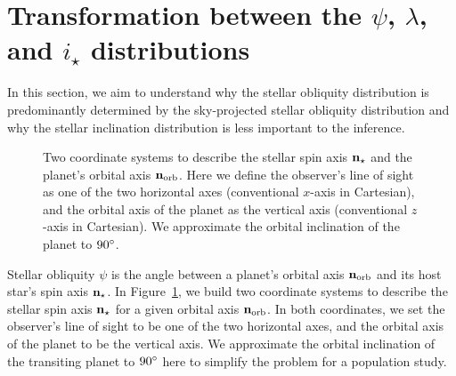 \documentclass[twocolumn,times]{aastex631}
\begin{document}
\section{Transformation between the $\psi$, $\lambda$, and \lowercase{$i_\star$} distributions}\label{sec:jacobian}

In this section, we aim to understand why the stellar obliquity distribution is predominantly determined by the sky-projected stellar obliquity distribution and why the stellar inclination distribution is less important to the inference.

\begin{figure*}[ht!]
    \vspace*{-1.5cm}
    \caption{Two coordinate systems to describe the stellar spin axis $\bf{n}_{\star}$ and the planet's orbital axis $\bf{n}_{\rm orb}$. Here we define the observer's line of sight as one of the two horizontal axes (conventional $x$-axis in Cartesian), and the orbital axis of the planet as the vertical axis (conventional $z$-axis in Cartesian). We approximate the orbital inclination of the planet to $90\mbox{$^\circ$}$.}
    \label{fig:coord}
\end{figure*}

Stellar obliquity $\psi$ is the angle between a planet's orbital axis $\bf{n}_{\rm orb}$ and its host star's spin axis $\bf{n}_{\star}$. In Figure~\ref{fig:coord}, we build two coordinate systems to describe the stellar spin axis $\bf{n}_{\star}$ for a given orbital axis $\bf{n}_{\rm orb}$. In both coordinates, we set the observer's line of sight to be one of the two horizontal axes, and the orbital axis of the planet to be the vertical axis. We approximate the orbital inclination of the transiting planet to $90\mbox{$^\circ$}$ here to simplify the problem for a population study.
\end{document}
